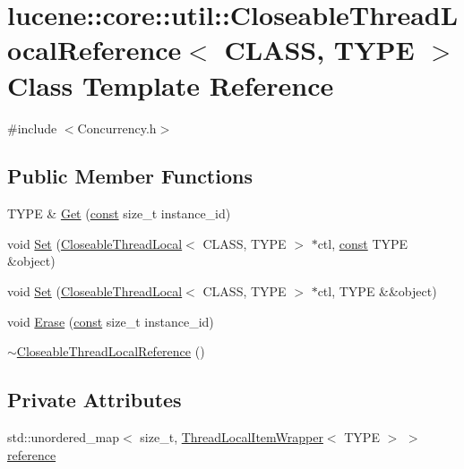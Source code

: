 \hypertarget{classlucene_1_1core_1_1util_1_1CloseableThreadLocalReference}{}\section{lucene\+:\+:core\+:\+:util\+:\+:Closeable\+Thread\+Local\+Reference$<$ C\+L\+A\+SS, T\+Y\+PE $>$ Class Template Reference}
\label{classlucene_1_1core_1_1util_1_1CloseableThreadLocalReference}


{\ttfamily \#include $<$Concurrency.\+h$>$}

\subsection*{Public Member Functions}
\begin{DoxyCompactItemize}
\item 
T\+Y\+PE \& \mbox{\hyperlink{classlucene_1_1core_1_1util_1_1CloseableThreadLocalReference_a3cb386298ca2b0b974705f591b313891}{Get}} (\mbox{\hyperlink{ZlibCrc32_8h_a2c212835823e3c54a8ab6d95c652660e}{const}} size\+\_\+t instance\+\_\+id)
\item 
void \mbox{\hyperlink{classlucene_1_1core_1_1util_1_1CloseableThreadLocalReference_a0492bd60f1e06eef9e03020d97bb7c91}{Set}} (\mbox{\hyperlink{classlucene_1_1core_1_1util_1_1CloseableThreadLocal}{Closeable\+Thread\+Local}}$<$ C\+L\+A\+SS, T\+Y\+PE $>$ $\ast$ctl, \mbox{\hyperlink{ZlibCrc32_8h_a2c212835823e3c54a8ab6d95c652660e}{const}} T\+Y\+PE \&object)
\item 
void \mbox{\hyperlink{classlucene_1_1core_1_1util_1_1CloseableThreadLocalReference_a2a565539a30bc0a9cac563262989775f}{Set}} (\mbox{\hyperlink{classlucene_1_1core_1_1util_1_1CloseableThreadLocal}{Closeable\+Thread\+Local}}$<$ C\+L\+A\+SS, T\+Y\+PE $>$ $\ast$ctl, T\+Y\+PE \&\&object)
\item 
void \mbox{\hyperlink{classlucene_1_1core_1_1util_1_1CloseableThreadLocalReference_a7f6be51394814fe98af69803fd978359}{Erase}} (\mbox{\hyperlink{ZlibCrc32_8h_a2c212835823e3c54a8ab6d95c652660e}{const}} size\+\_\+t instance\+\_\+id)
\item 
\mbox{\hyperlink{classlucene_1_1core_1_1util_1_1CloseableThreadLocalReference_a4088bd7d403b38fea1399bd592a6c73e}{$\sim$\+Closeable\+Thread\+Local\+Reference}} ()
\end{DoxyCompactItemize}
\subsection*{Private Attributes}
\begin{DoxyCompactItemize}
\item 
std\+::unordered\+\_\+map$<$ size\+\_\+t, \mbox{\hyperlink{classlucene_1_1core_1_1util_1_1ThreadLocalItemWrapper}{Thread\+Local\+Item\+Wrapper}}$<$ T\+Y\+PE $>$ $>$ \mbox{\hyperlink{classlucene_1_1core_1_1util_1_1CloseableThreadLocalReference_a1df112eff02d74eb49b69c548c197a5f}{reference}}
\end{DoxyCompactItemize}


